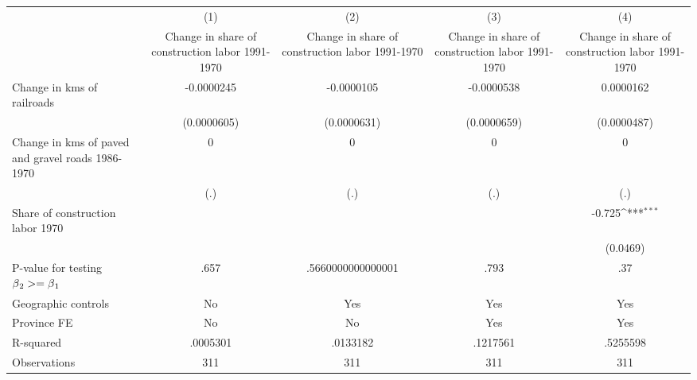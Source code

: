 {
\def\sym#1{\ifmmode^{#1}\else\(^{#1}\)\fi}
\begin{tabular}{l*{4}{c}}
\hline\hline
                &\multicolumn{1}{c}{(1)}&\multicolumn{1}{c}{(2)}&\multicolumn{1}{c}{(3)}&\multicolumn{1}{c}{(4)}\\
                &\multicolumn{1}{c}{Change in share of construction labor 1991-1970}&\multicolumn{1}{c}{Change in share of construction labor 1991-1970}&\multicolumn{1}{c}{Change in share of construction labor 1991-1970}&\multicolumn{1}{c}{Change in share of construction labor 1991-1970}\\
\hline
Change in kms of railroads&-0.0000245         &-0.0000105         &-0.0000538         &0.0000162         \\
                &(0.0000605)         &(0.0000631)         &(0.0000659)         &(0.0000487)         \\
[1em]
Change in kms of paved and gravel roads 1986-1970&        0         &        0         &        0         &        0         \\
                &      (.)         &      (.)         &      (.)         &      (.)         \\
[1em]
Share of construction labor 1970&                  &                  &                  &   -0.725\sym{***}\\
                &                  &                  &                  & (0.0469)         \\
\hline
P-value for testing $\beta\\_2 >= \beta\\_1$&     .657         &.5660000000000001         &     .793         &      .37         \\
Geographic controls&       No         &      Yes         &      Yes         &      Yes         \\
Province FE     &       No         &       No         &      Yes         &      Yes         \\
R-squared       & .0005301         & .0133182         & .1217561         & .5255598         \\
Observations    &      311         &      311         &      311         &      311         \\
\hline\hline
\end{tabular}
}
